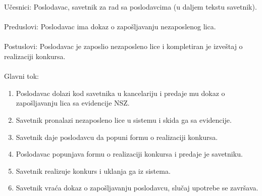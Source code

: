 \noindent U\v cesnici: Poslodavac, savetnik za rad sa poslodavcima (u daljem tekstu savetnik).
\\
\\ Preduslovi: Poslodavac ima dokaz o zapošljavanju nezaposlenog lica.
\\
\\ Postuslovi: Poslodavac je zaposlio nezaposleno lice i kompletiran je izve\v staj o realizaciji konkursa.
\\
\\ Glavni tok:
\begin{enumerate}
\item Poslodavac dolazi kod savetnika u kancelariju i predaje mu dokaz o zapošljavanju lica sa evidencije NSZ.
\item Savetnik pronalazi nezaposleno lice u sistemu i skida ga sa evidencije.
\item Savetnik daje poslodavcu da popuni formu o realizaciji konkursa.
\item Poslodavac popunjava  formu o realizaciji konkursa i predaje je savetniku.
\item Savetnik realizuje konkurs i uklanja ga iz sistema.
\item Savetnik vraća dokaz o zapošljavanju  poslodavcu, slučaj upotrebe se završava.
\end{enumerate}

